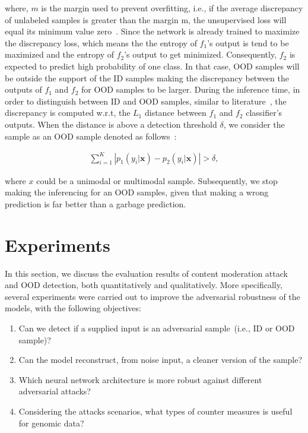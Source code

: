 \hspace*{3.5mm} where, $m$ is the margin used to prevent overfitting, i.e., if the average discrepancy of unlabeled samples is greater than the margin m, the unsupervised loss will equal its minimum value zero~\cite{yu2019unsupervised}. Since the network is already trained to maximize the discrepancy loss, which means the the entropy of $f_1$’s output is tend to be maximized and the entropy of $f_2$’s output to get minimized. Consequently, $f_2$ is expected to predict high probability of one class. In that case, OOD samples will be outside the support of the ID samples making the discrepancy between the outputs of $f_{1}$ and $f_{2}$ for OOD samples to be larger. During the inference time, in order to distinguish between ID and OOD samples, similar to literature~\cite{yu2019unsupervised}, the discrepancy is computed w.r.t, the $L_1$ distance between $f_{1}$ and $f_{2}$ classifier's outputs. When the distance is above a detection threshold $\delta$, we consider the sample as an OOD sample denoted as follows~\cite{yu2019unsupervised}: 

\vspace{-6mm}
\begin{align}
    \sum_{i=1}^{K}\left|p_{1}\left(y_{i} | \mathbf{x}\right)-p_{2}\left(y_{i} | \mathbf{x}\right)\right|>\delta, 
\end{align}

\hspace*{3.5mm} where $x$ could be a unimodal or multimodal sample. Subsequently, we stop making the inferencing for an OOD samples, given that making a wrong prediction is far better than a garbage prediction. 

\section{Experiments}\label{chapter_6:results} 
In this section, we discuss the evaluation results of content moderation attack and OOD detection, both quantitatively and qualitatively. %
More specifically, several experiments were carried out to improve the adversarial robustness of the models, with the following objectives:

\begin{enumerate}[noitemsep]
    \item Can we detect if a supplied input is an adversarial sample~(i.e., ID or OOD sample)? 
    \item Can the model reconstruct, from noise input, a cleaner version of the sample? 
    \item Which neural network architecture is more robust against different adversarial attacks?  
    \item Considering the attacks scenarios, what types of counter measures is useful for genomic data?
\end{enumerate}

